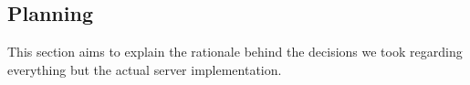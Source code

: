 \subsection{Planning}
This section aims to explain the rationale behind the decisions we took regarding everything but the actual server implementation.






\newpage
